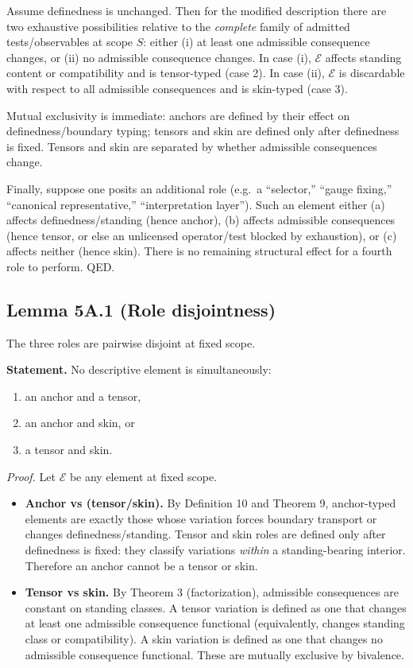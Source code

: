 \documentclass[12pt]{article}
\theoremstyle{plain}
\begin{document}
Assume definedness is unchanged. Then for the modified description there are two exhaustive possibilities relative to the \emph{complete} family of admitted tests/observables at scope $S$: either (i) at least one admissible consequence changes, or (ii) no admissible consequence changes. In case (i), $\mathcal{E}$ affects standing content or compatibility and is tensor-typed (case 2). In case (ii), $\mathcal{E}$ is discardable with respect to all admissible consequences and is skin-typed (case 3).

Mutual exclusivity is immediate: anchors are defined by their effect on definedness/boundary typing; tensors and skin are defined only after definedness is fixed. Tensors and skin are separated by whether admissible consequences change.

Finally, suppose one posits an additional role (e.g.\ a ``selector,'' ``gauge fixing,'' ``canonical representative,'' ``interpretation layer''). Such an element either (a) affects definedness/standing (hence anchor), (b) affects admissible consequences (hence tensor, or else an unlicensed operator/test blocked by exhaustion), or (c) affects neither (hence skin). There is no remaining structural effect for a fourth role to perform. QED.


\subsection{Lemma 5A.1 (Role disjointness)}

The three roles are pairwise disjoint at fixed scope.

\medskip

\noindent\textbf{Statement.} No descriptive element is simultaneously:
\begin{enumerate}[leftmargin=*]
\item an anchor and a tensor,
\item an anchor and skin, or
\item a tensor and skin.
\end{enumerate}

\textit{Proof.} Let $\mathcal{E}$ be any element at fixed scope.

\begin{itemize}[leftmargin=*]
\item \textbf{Anchor vs (tensor/skin).} By Definition 10 and Theorem 9, anchor-typed elements are exactly those whose variation forces boundary transport or changes definedness/standing. Tensor and skin roles are defined only after definedness is fixed: they classify variations \emph{within} a standing-bearing interior. Therefore an anchor cannot be a tensor or skin.

\item \textbf{Tensor vs skin.} By Theorem 3 (factorization), admissible consequences are constant on standing classes. A tensor variation is defined as one that changes at least one admissible consequence functional (equivalently, changes standing class or compatibility). A skin variation is defined as one that changes no admissible consequence functional. These are mutually exclusive by bivalence.
\end{itemize}
\end{document}
